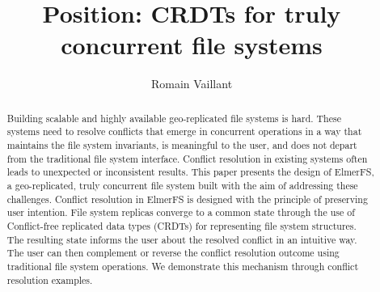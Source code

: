 \documentclass[sigconf,anonymous,10pt]{acmart}
\begin{document}
\title{Position: CRDTs for truly concurrent file systems}

\author{Romain Vaillant}


\renewcommand{\shortauthors}{R. Vaillant et al.}

\begin{abstract}
Building scalable and highly available geo-replicated file systems is hard.
These systems need to resolve conflicts that emerge in concurrent operations in a way
that maintains the file system invariants, is meaningful to the user,
and does not depart from the traditional file system interface.
Conflict resolution in existing systems often leads to unexpected or inconsistent
results.
This paper presents the design of ElmerFS, a geo-replicated, truly concurrent
file system built with the aim of addressing these challenges.
Conflict resolution in ElmerFS is designed with the principle of preserving
user intention.
File system replicas converge to a common state through the use of Conflict-free
replicated data types (CRDTs) for representing file system structures.
The resulting state informs the user about the resolved conflict in an intuitive way.
The user can then complement or reverse the conflict resolution outcome using
traditional file system operations.
We demonstrate this mechanism through conflict resolution examples.

\end{abstract}

\end{document}
